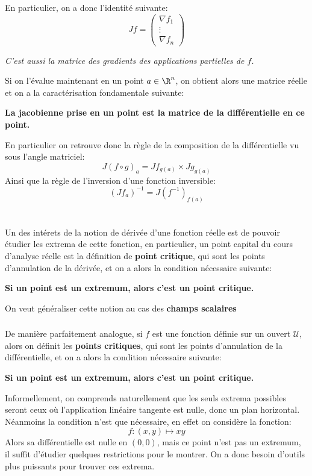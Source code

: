 En particulier, on a donc l'identité suivante:
\[
   Jf = \begin{pmatrix}
      \nabla f_1\\
      \vdots\\ 
      \nabla f_n
   \end{pmatrix}
\]
\begin{center}
   \textit{C'est aussi la matrice des gradients des applications partielles de \(f\).}
\end{center}
Si on l'évalue maintenant en un point \(a \in \R^n\), on obtient alors une matrice réelle et on a la caractérisation fondamentale suivante:
\begin{center}
   \textbf{La jacobienne prise en un point est la matrice de la différentielle en ce point.}
\end{center}
En particulier on retrouve donc la règle de la composition de la différentielle vu sous l'angle matriciel:
\[
   J(f \circ g)_a = Jf_{g(a)} \times Jg_{g(a)}
\]
Ainsi que la règle de l'inversion d'une fonction inversible:
\[
   (Jf_{a})^{-1} = J(f^{-1})_{f(a)}
\]

\chapter*{}
Un des intérets de la notion de dérivée d'une fonction réelle est de pouvoir étudier les extrema de cette fonction, en particulier, un point capital du cours d'analyse réelle est la définition de \textbf{point critique}, qui sont les points d'annulation de la dérivée, et on a alors la condition nécessaire suivante:
\begin{center}
   \textbf{Si un point est un extremum, alors c'est un point critique.}
\end{center}
On veut généraliser cette notion au cas des \textbf{champs scalaires}

\subsection*{}
De manière parfaitement analogue, si \(f\) est une fonction définie sur un ouvert \(\mathcal{U}\), alors on définit les \textbf{points critiques}, qui sont les points d'annulation de la différentielle, et on a alors la condition nécessaire suivante:
\begin{center}
   \textbf{Si un point est un extremum, alors c'est un point critique.}
\end{center}
Informellement, on comprends naturellement que les seuls extrema possibles seront ceux où l'application linéaire tangente est nulle, donc un plan horizontal. Néanmoins la condition n'est que nécessaire, en effet on considère la fonction:
\[
   f : (x, y) \mapsto xy   
\]
Alors sa différentielle est nulle en \((0, 0)\), mais ce point n'est pas un extremum, il suffit d'étudier quelques restrictions pour le montrer. On a donc besoin d'outils plus puissants pour trouver ces extrema. 

